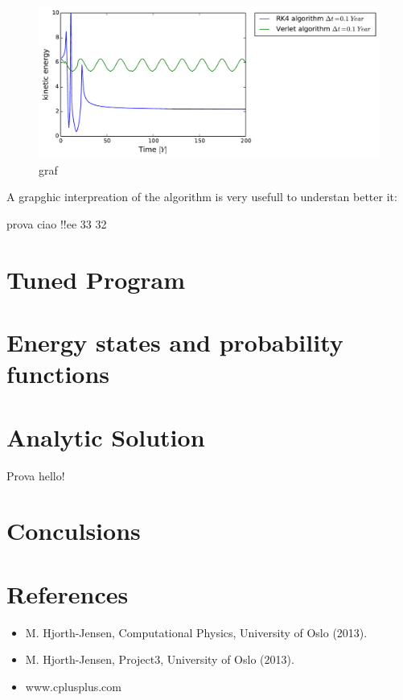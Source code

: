 \documentclass[a4paper]{article}
\begin{document}
 \begin{figure}[!h]
\centering
\includegraphics[width=1.02\textwidth]{outvel.pdf}
\caption{graf}
\end{figure}


A grapghic interpreation of the algorithm is very usefull to understan better it:

prova ciao !!ee 33
32
\section{Tuned Program}
\section{Energy states and probability functions}\label{2electrons}

\pagebreak
\section{Analytic Solution}
Prova hello!
\pagebreak
\section{Conculsions}

\section{References}
\begin{itemize}
\item M. Hjorth-Jensen, 
Computational Physics, University of Oslo (2013).
\item M. Hjorth-Jensen, 
Project3, University of Oslo (2013).
\item www.cplusplus.com
\end{itemize}
\end{document}

